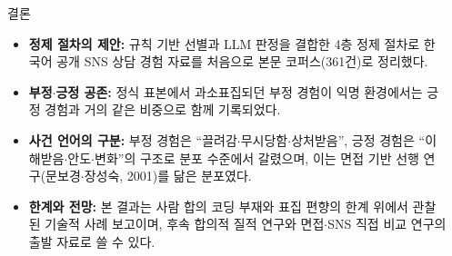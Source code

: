 \documentclass[final]{beamer}
\newlength{\sepwidth}
\newlength{\colwidth}
\newcommand{\separatorcolumn}{\begin{column}{\sepwidth}\end{column}}
\begin{document}
\begin{frame}[t]
\begin{columns}[t]
\begin{column}{\colwidth}
  \begin{exampleblock}{결론}
    \begin{itemize}
      \item \textbf{정제 절차의 제안:} 규칙 기반 선별과 LLM 판정을 결합한 4층 정제 절차로 한국어 공개 SNS 상담 경험 자료를 처음으로 본문 코퍼스(361건)로 정리했다.
      \item \textbf{부정$\cdot$긍정 공존:} 정식 표본에서 과소표집되던 부정 경험이 익명 환경에서는 긍정 경험과 거의 같은 비중으로 함께 기록되었다.
      \item \textbf{사건 언어의 구분:} 부정 경험은 ``끌려감$\cdot$무시당함$\cdot$상처받음'', 긍정 경험은 ``이해받음$\cdot$안도$\cdot$변화''의 구조로 분포 수준에서 갈렸으며, 이는 면접 기반 선행 연구(문보경$\cdot$장성숙, 2001)를 닮은 분포였다.
      \item \textbf{한계와 전망:} 본 결과는 사람 합의 코딩 부재와 표집 편향의 한계 위에서 관찰된 기술적 사례 보고이며, 후속 합의적 질적 연구와 면접$\cdot$SNS 직접 비교 연구의 출발 자료로 쓸 수 있다.
    \end{itemize}
  \end{exampleblock}

\end{column}
\separatorcolumn

\end{columns}
\end{frame}
\end{document}
